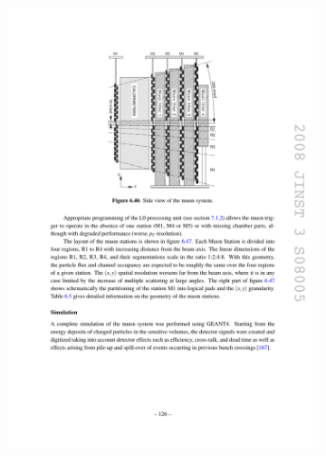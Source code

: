 
\begin{figure}[!h]
    \centering
    \begin{subfigure}[t]{0.4\textwidth}
        \centering        
        \includegraphics[width=1.0\textwidth]{figs/Detector/muon_layout.pdf}
    \end{subfigure}
    \begin{subfigure}[t]{0.4\textwidth}

\end{subfigure}
\end{figure}
